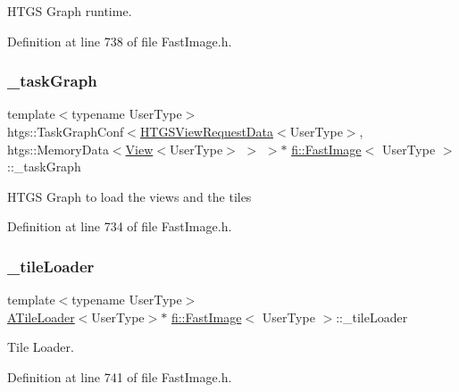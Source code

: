H\+T\+GS Graph runtime. 



Definition at line 738 of file Fast\+Image.\+h.

\mbox{\label{classfi_1_1FastImage_af3d88915c813b26921a6e329f1880b20}} 
\subsubsection{\texorpdfstring{\+\_\+task\+Graph}{\_taskGraph}}
{\footnotesize\ttfamily template$<$typename User\+Type$>$ \\
htgs\+::\+Task\+Graph\+Conf$<$\hyperlink{classfi_1_1HTGSViewRequestData}{H\+T\+G\+S\+View\+Request\+Data}$<$User\+Type$>$, htgs\+::\+Memory\+Data$<$\hyperlink{classfi_1_1View}{View}$<$User\+Type$>$ $>$ $>$$\ast$ \hyperlink{classfi_1_1FastImage}{fi\+::\+Fast\+Image}$<$ User\+Type $>$\+::\+\_\+task\+Graph\hspace{0.3cm}{\ttfamily [private]}}

H\+T\+GS Graph to load the views and the tiles 

Definition at line 734 of file Fast\+Image.\+h.

\mbox{\label{classfi_1_1FastImage_ae2b26c6fbdedf4f23ddf57f1b95828ab}} 
\subsubsection{\texorpdfstring{\+\_\+tile\+Loader}{\_tileLoader}}
{\footnotesize\ttfamily template$<$typename User\+Type$>$ \\
\hyperlink{classfi_1_1ATileLoader}{A\+Tile\+Loader}$<$User\+Type$>$$\ast$ \hyperlink{classfi_1_1FastImage}{fi\+::\+Fast\+Image}$<$ User\+Type $>$\+::\+\_\+tile\+Loader\hspace{0.3cm}{\ttfamily [private]}}



Tile Loader. 



Definition at line 741 of file Fast\+Image.\+h.

\mbox{\label{classfi_1_1FastImage_ab93b796420eb2bbd6263dff2294be1d7}} 
